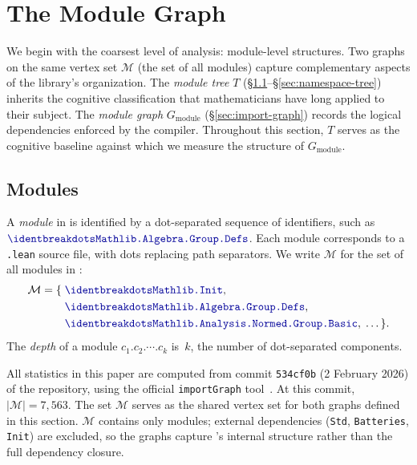 \section{The Module Graph}
\label{sec:module-import}

We begin with the coarsest level of analysis: module-level structures. Two graphs on the same vertex set $\mathcal{M}$ (the set of all  modules) capture complementary aspects of the library's organization. The \emph{module tree} $T$ (\S\ref{sec:module-names}--\S\ref{sec:namespace-tree}) inherits the cognitive classification that mathematicians have long applied to their subject. The \emph{module graph} $G_{\mathrm{module}}$ (\S\ref{sec:import-graph}) records the logical dependencies enforced by the compiler. Throughout this section, $T$ serves as the cognitive baseline against which we measure the structure of $G_{\mathrm{module}}$.

\subsection{Modules}
\label{sec:module-names}
\begin{definition}[Module]\label{def:module}
A \emph{module} in  is identified by a dot-separated sequence of identifiers, such as $\module{Mathlib.Algebra.Group.Defs}$. Each module corresponds to a \texttt{.lean} source file, with dots replacing path separators. We write $\mathcal{M}$ for the set of all modules in :
\begin{align*}
  \mathcal{M} = \{\; &\module{Mathlib.Init},\\
    &\module{Mathlib.Algebra.Group.Defs},\\
    &\module{Mathlib.Analysis.Normed.Group.Basic},\; \ldots\,\}.
\end{align*}
The \emph{depth} of a module $c_1.c_2.\cdots.c_k$ is~$k$, the number of dot-separated components.
\end{definition}

All statistics in this paper are computed from commit \texttt{534cf0b} (2 February 2026) of the  repository, using the official \texttt{importGraph} tool~\cite{importgraph}. At this commit, $|\mathcal{M}| = 7{,}563$. The set $\mathcal{M}$ serves as the shared vertex set for both graphs defined in this section. $\mathcal{M}$ contains only  modules; external dependencies (\texttt{Std}, \texttt{Batteries}, \texttt{Init}) are excluded, so the graphs capture 's internal structure rather than the full dependency closure.

